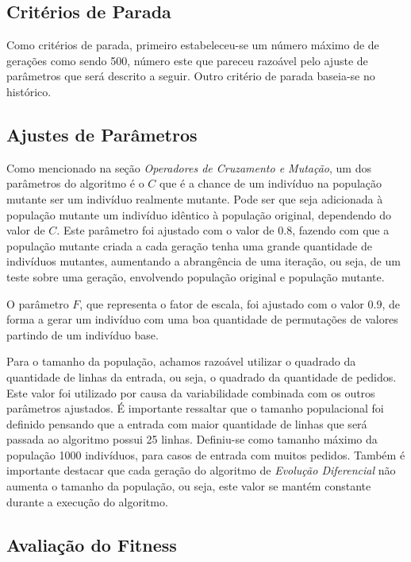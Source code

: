 \documentclass[12pt]{elsarticle}
\begin{document}
	\subsection{Critérios de Parada}
	Como critérios de parada, primeiro estabeleceu-se um número máximo de de gerações como sendo 500, número este que pareceu razoável pelo ajuste de parâmetros que será descrito a seguir. Outro critério de parada baseia-se no histórico. %
	
	\subsection{Ajustes de Parâmetros}
	Como mencionado na seção \textit{Operadores de Cruzamento e Mutação}, um dos parâmetros do algoritmo é o $C$ que é a chance de um indivíduo na população mutante ser um indivíduo realmente mutante. Pode ser que seja adicionada à população mutante um indivíduo idêntico à população original, dependendo do valor de $C$. Este parâmetro foi ajustado com o valor de $0.8$, fazendo com que a população mutante criada a cada geração tenha uma grande quantidade de indivíduos mutantes, aumentando a abrangência de uma iteração, ou seja, de um teste sobre uma geração, envolvendo população original e população mutante.
	
	O parâmetro $F$, que representa o fator de escala, foi ajustado com o valor $0.9$, de forma a gerar um indivíduo com uma boa quantidade de permutações de valores partindo de um indivíduo base.
	
	Para o tamanho da população, achamos razoável utilizar o quadrado da quantidade de linhas da entrada, ou seja, o quadrado da quantidade de pedidos. Este valor foi utilizado por causa da variabilidade combinada com os outros parâmetros ajustados. É importante ressaltar que o tamanho populacional foi definido pensando que a entrada com maior quantidade de linhas que será passada ao algoritmo possui 25 linhas. Definiu-se como tamanho máximo da população 1000 indivíduos, para casos de entrada com muitos pedidos. Também é importante destacar que cada geração do algoritmo de \textit{Evolução Diferencial} não aumenta o tamanho da população, ou seja, este valor se mantém constante durante a execução do algoritmo.
	
	\subsection{Avaliação do Fitness}
	
\end{document}
